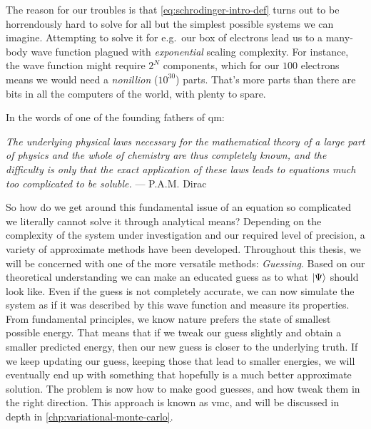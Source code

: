 \documentclass[Thesis.tex]{subfiles}
\begin{document}
The reason for our troubles is that \cref{eq:schrodinger-intro-def} turns out to
be horrendously hard to solve for all but the simplest possible systems we can
imagine. Attempting to solve it for e.g.\ our box of electrons lead us to
a many-body wave function plagued with \emph{exponential} scaling complexity.
For instance, the wave function might require $2^N$ components, which for our
$\num{100}$ electrons means we would need a \emph{nonillion} ($10^{30}$) parts. That's
more parts than there are bits in all the computers of the world, with plenty to
spare.

\begin{comment}
In most other areas of science we have been able to tame the mathematical
challenges through sophisticated high-performance computational frameworks.
Scaling complexities of $N^2$, $N^3$ or similar can usually be overcome by
simply using bigger and better computers, all the way to supercomputers with
hundreds of thousands of cores. But exponential scaling - that becomes
infeasible quickly.
\end{comment}

In the words of one of the founding fathers of \acrshort{qm}:
\begin{displayquote}
\emph{The underlying physical laws necessary for the mathematical theory of a large
part of physics and the whole of chemistry are thus completely known, and the
difficulty is only that the exact application of these laws leads to equations
much too complicated to be soluble.} --- P.A.M. Dirac
\end{displayquote}

So how do we get around this fundamental issue of an equation so complicated
we literally cannot solve it through analytical means? Depending on the
complexity of the system under investigation and our required level of
precision, a variety of approximate methods have been developed. Throughout this
thesis, we will be concerned with one of the more versatile methods:
\emph{Guessing}. Based on our theoretical understanding we can make an educated
guess as to what $| \Psi \rangle$ should look like. Even if the guess is not
completely accurate, we can now simulate the system as if it was described by
this wave function and measure its properties. From fundamental principles, we
know nature prefers the state of smallest possible energy. That means that if we
tweak our guess slightly and obtain a smaller predicted energy, then our new
guess is closer to the underlying truth. If we keep updating our guess, keeping
those that lead to smaller energies, we will eventually end up with something
that hopefully is a much better approximate solution. The problem is now how to
make good guesses, and how tweak them in the right direction. This approach is
known as \acrfull{vmc}, and will be discussed in depth in
\cref{chp:variational-monte-carlo}.\\
\end{document}
